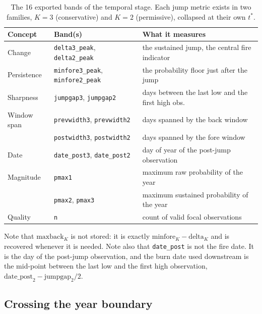 \documentclass[11pt,a4paper]{article}
\begin{document}
\begin{table}[ht]
\centering
\caption{The 16 exported bands of the temporal stage. Each jump metric exists in two families,
\(K=3\) (conservative) and \(K=2\) (permissive), collapsed at their own \(t^{*}\).}
\label{tab-bpts-bands}
\small
\begin{tabular}{l l l}
\toprule
Concept & Band(s) & What it measures \\
\midrule
Change      & \texttt{delta3\_peak}, \texttt{delta2\_peak}       & the sustained jump, the central fire indicator \\
Persistence & \texttt{minfore3\_peak}, \texttt{minfore2\_peak}   & the probability floor just after the jump \\
Sharpness   & \texttt{jumpgap3}, \texttt{jumpgap2}               & days between the last low and the first high obs. \\
Window span & \texttt{prevwidth3}, \texttt{prevwidth2}           & days spanned by the back window \\
            & \texttt{postwidth3}, \texttt{postwidth2}           & days spanned by the fore window \\
Date        & \texttt{date\_post3}, \texttt{date\_post2}         & day of year of the post-jump observation \\
Magnitude   & \texttt{pmax1}                                     & maximum raw probability of the year \\
            & \texttt{pmax2}, \texttt{pmax3}                     & maximum sustained probability of the year \\
Quality     & \texttt{n}                                         & count of valid focal observations \\
\bottomrule
\end{tabular}
\end{table}

\FloatBarrier

Note that \(\mathrm{maxback}_K\) is not stored: it is exactly
\(\mathrm{minfore}_K - \mathrm{delta}_K\) and is recovered whenever it is needed. Note also that
\texttt{date\_post} is not the fire date. It is the day of the post-jump observation, and the burn
date used downstream is the mid-point between the last low and the first high observation,
\(\mathrm{date\_post}_2 - \mathrm{jumpgap}_2/2\).

\subsection{Crossing the year boundary}
\end{document}
